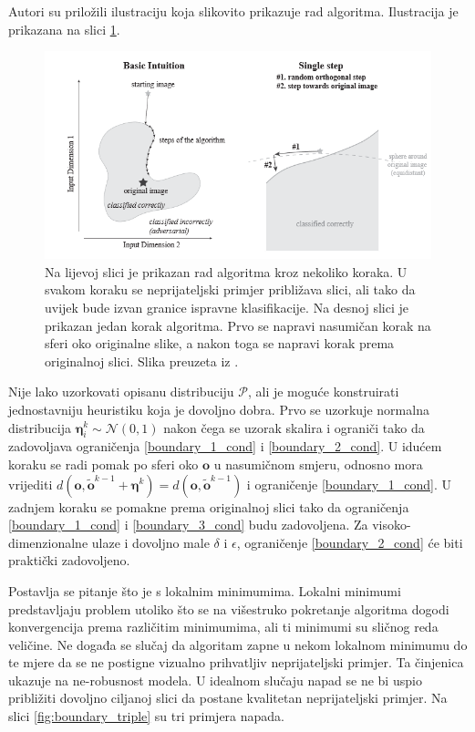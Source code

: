 \documentclass[utf8, diplomski]{fer}
\begin{document}
Autori su priložili ilustraciju koja slikovito prikazuje rad algoritma. Ilustracija je prikazana na slici \ref{fig:boundary_intuition}.


\begin{figure}[H]
\centering
\includegraphics[width=1.0\textwidth,keepaspectratio]{img/other/boundary_intuition.png}
\caption{Na lijevoj slici je prikazan rad algoritma kroz nekoliko koraka. U svakom koraku se neprijateljski primjer približava slici, ali tako da uvijek bude izvan granice ispravne klasifikacije. Na desnoj slici je prikazan jedan korak algoritma. Prvo se napravi nasumičan korak na sferi oko originalne slike, a nakon toga se napravi korak prema originalnoj slici. Slika preuzeta iz \citep{Brendel2017DecisionBasedAA}.}
\label{fig:boundary_intuition}
\end{figure}

Nije lako uzorkovati opisanu distribuciju $\mathcal{P}$, ali je moguće konstruirati jednostavniju heuristiku koja je dovoljno dobra. Prvo se uzorkuje normalna distribucija $\boldsymbol{\eta}_{i}^{k} \sim \mathcal{N}(0, 1)$ nakon čega se uzorak skalira i ograniči tako da zadovoljava ograničenja \ref{boundary_1_cond} i \ref{boundary_2_cond}. U idućem koraku se radi pomak po sferi oko $\boldsymbol{o}$ u nasumičnom smjeru, odnosno mora vrijediti $d(\boldsymbol{o}, \boldsymbol{\tilde{o}}^{k-1} + \boldsymbol{\eta}^{k}) = d(\boldsymbol{o}, \boldsymbol{\tilde{o}}^{k-1})$ i ograničenje \ref{boundary_1_cond}. U zadnjem koraku se pomakne prema originalnoj slici tako da ograničenja \ref{boundary_1_cond} i \ref{boundary_3_cond} budu zadovoljena. Za visoko-dimenzionalne ulaze i dovoljno male $\delta$ i $\epsilon$, ograničenje \ref{boundary_2_cond} će biti praktički zadovoljeno. \par
Postavlja se pitanje što je s lokalnim minimumima. Lokalni minimumi predstavljaju problem utoliko što se na višestruko pokretanje algoritma dogodi konvergencija prema različitim minimumima, ali ti minimumi su sličnog reda veličine. Ne događa se slučaj da algoritam zapne u nekom lokalnom minimumu do te mjere da se ne postigne vizualno prihvatljiv neprijateljski primjer. Ta činjenica ukazuje na ne-robusnost modela. U idealnom slučaju napad se ne bi uspio približiti dovoljno ciljanoj slici da postane kvalitetan neprijateljski primjer. Na slici \ref{fig:boundary_triple} su tri primjera napada. \par
\end{document}
